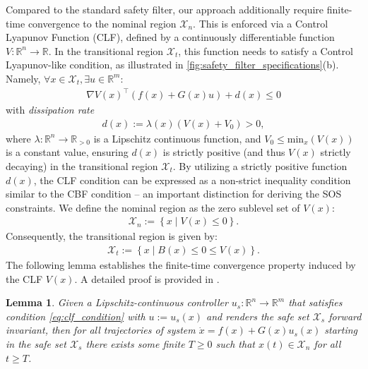 \documentclass[lettersize,journal]{IEEEtran}
\newcommand{\R}{\mathbb{R}}
\newtheorem{lemma}{Lemma}
\begin{document}
Compared to the standard safety filter, our approach additionally require finite-time convergence to the nominal region $\mathcal X_n$. %
This is enforced via a Control Lyapunov Function (CLF), defined by a continuously differentiable function $V: \R^n \to \R$.
In the transitional region $\mathcal X_t$, this function needs to satisfy a Control Lyapunov-like condition, as illustrated in \cref{fig:safety_filter_specifications}(b).
Namely, $\forall x \in \mathcal X_t, \exists u \in \R^m$:
\begin{align} \label{eq:clf_condition}
   \nabla V(x)^\top \left ( f(x) + G(x) u \right ) + d(x) \leq 0
\end{align}
with \emph{dissipation rate}
\begin{align} \label{eq:dissipation_rate}
   d(x) := \lambda(x) \left ( V(x) + V_0 \right ) > 0,
\end{align}
where $\lambda: \R^n \to \R_{> 0}$ is a Lipschitz continuous function, and $V_0 \leq \text{min}_x \left ( V(x) \right )$ is a constant value, ensuring $d(x)$ is strictly positive (and thus $V(x)$ strictly decaying) in the transitional region $\mathcal X_t$.
By utilizing a strictly positive function $d(x)$, the CLF condition can be expressed as a non-strict inequality condition similar to the CBF condition -- an important distinction for deriving the SOS constraints.
We define the nominal region as the zero sublevel set of $V(x)$:
\begin{align*}
   \mathcal X_n := \left \{ x \mid V(x) \leq 0 \right \}.
\end{align*}
Consequently, the transitional region is given by:
\begin{align*}
   \mathcal X_t := \left \{ x \mid B(x) \leq 0 \leq V(x) \right \}.
\end{align*}
The following lemma establishes the finite-time convergence property induced by the CLF $V(x)$. 
A detailed proof is provided in \cite{schneeberger2024advanced}.
\begin{lemma} \label{thm:finite_time_convergence}
   Given a Lipschitz-continuous controller $u_s: \R^n \to \R^m$ that satisfies condition \cref{eq:clf_condition} with $u := u_s(x)$ and renders the safe set $\mathcal X_s$ forward invariant,
   then for all trajectories of system $\dot x = f(x) + G(x) u_s(x)$ starting in the safe set $\mathcal X_s$ there exists some finite $T \geq 0$ such that $x(t) \in \mathcal X_n$ for all $t \geq T$.
\end{lemma}
\end{document}
